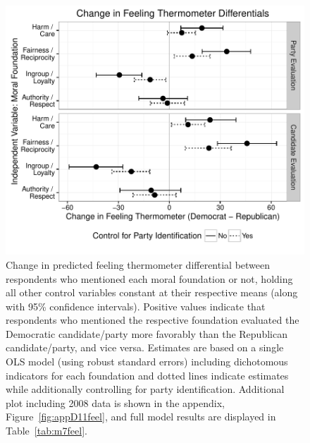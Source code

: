 \documentclass[12pt]{article}
\begin{document}
\begin{figure}[h]\centering
\includegraphics[scale=.9]{../calc/fig/fig7feel.pdf}
\caption{Change in predicted feeling thermometer differential between respondents who mentioned each moral foundation or not, holding all other control variables constant at their respective means (along with 95\% confidence intervals). Positive values indicate that respondents who mentioned the respective foundation evaluated the Democratic candidate/party more favorably than the Republican candidate/party, and vice versa. Estimates are based on a single OLS model (using robust standard errors) including dichotomous indicators for each foundation and dotted lines indicate estimates while additionally controlling for party identification. Additional plot including 2008 data is shown in the appendix, Figure~\ref{fig:appD11feel}, and full model results are displayed in Table~\ref{tab:m7feel}.}\label{fig:7feel}
\end{figure}
\end{document}
